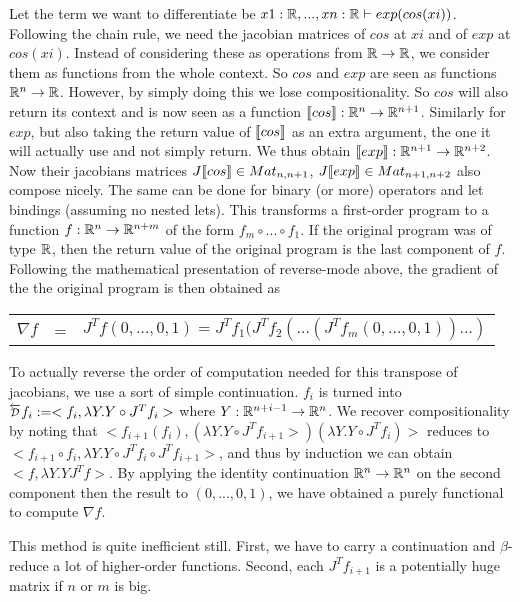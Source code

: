 Let the term we want to differentiate be $x1:\mathbb{R},...,xn:\mathbb{R}\vdash exp(cos(xi))$.
Following the chain rule, we need the jacobian matrices of $cos$ at $xi$ and of $exp$ at $cos(xi)$. 
Instead of considering these as operations from $\mathbb{R}\to\mathbb{R}$, we consider them as functions from the whole context. So $cos$ and $exp$ are seen as functions $\mathbb{R}^n\to\mathbb{R}$.
However, by simply doing this we lose compositionality. 
So $cos$ will also return its context and is now seen as a function $\llbracket cos\rrbracket:\mathbb{R}^n\to\mathbb{R}^{n+1}$.
Similarly for $exp$, but also taking the return value of $\llbracket cos\rrbracket$ as an extra argument, the one it will actually use and not simply return. 
We thus obtain $\llbracket exp\rrbracket:\mathbb{R}^{n+1}\to\mathbb{R}^{n+2}$. Now their jacobians matrices $J\llbracket cos\rrbracket \in Mat_{n,n+1}$, $J\llbracket exp\rrbracket \in Mat_{n+1,n+2}$ also compose nicely.
The same can be done for binary (or more) operators and let bindings (assuming no nested lets). 
This transforms a first-order program to a function $f:\mathbb{R}^n\to\mathbb{R}^{n+m}$ of the form $f_m\circ...\circ f_1$. 
If the original program was of type $\mathbb{R}$, then the return value of the original program is the last component of $f$.
Following the mathematical presentation of reverse-mode above, the gradient of the the original program is then obtained as 
\begin{center}
    \begin{tabular}{r c l}
        $\nabla f$ &=& $J^Tf(0,\ldots,0,1)=J^Tf_1(J^Tf_{2}(\ldots(J^Tf_m(0,\ldots,0,1))\ldots)$
    \end{tabular}
\end{center}

To actually reverse the order of computation needed for this transpose of jacobians, we use a sort of simple continuation.
$f_i$ is turned into $\Dsynrevsymbol{f_i}:=<f_i, \lambda Y. Y\circ J^Tf_i>$ where $Y:\mathbb{R}^{n+i-1}\to \mathbb{R}^n$. 
We recover compositionality by noting that $<f_{i+1}(f_i), (\lambda Y. Y\circ J^Tf_{i+1}>)(\lambda Y. Y\circ J^Tf_i)>$ reduces to
$<f_{i+1}\circ f_i, \lambda Y. Y\circ J^Tf_i \circ J^Tf_{i+1}>$, and thus by induction we can obtain $<f, \lambda Y. YJ^Tf>$.
By applying the identity continuation $\mathbb{R}^n\to\mathbb{R}^n$ on the second component then the result to $(0,...,0,1)$, 
we have obtained a purely functional to compute $\nabla f$. 

This method is quite inefficient still. First, we have to carry a continuation and $\beta$-reduce a lot of higher-order functions.
Second, each $J^Tf_{i+1}$ is a potentially huge matrix if $n$ or $m$ is big.

